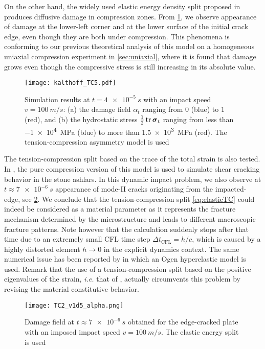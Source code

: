 On the other hand, the widely used elastic energy density split proposed in \cite{MieheHofackerWelschinger:2010} produces diffusive damage in compression zones. From \cref{fig:v1d5_miehe}, we observe appearance of damage at the lower-left corner and at the lower surface of the initial crack edge, even though they are both under compression. This phenomena is conforming to our previous theoretical analysis of this model on a homogeneous uniaxial compression experiment in \cref{sec:uniaxial}, where it is found that damage grows even though the compressive stress is still increasing in its absolute value.
\begin{figure}[htbp]
\centering
\texttt{[image: kalthoff\_TC5.pdf]}
\caption{Simulation results at $t=\SI{4e-5}{s}$ with an impact speed $v=\SI{100}{m/s}$: (a) the damage field $\alpha_t$ ranging from 0 (blue) to 1 (red), and (b) the hydrostatic stress $\frac{1}{2}\tr\sig_t$ ranging from less than \SI{-1e4}{MPa} (blue) to more than \SI{1.5e3}{MPa} (red). The tension-compression asymmetry model \cite{MieheHofackerWelschinger:2010} is used} \label{fig:v1d5_miehe}
\end{figure}

The tension-compression split based on the trace of the total strain \cite{AmorMarigoMaurini:2009} is also tested. In \cite{LancioniRoyer-Carfagni:2009}, the pure compression version of this model is used to simulate shear cracking behavior in the stone ashlars. In this dynamic impact problem, we also observe at $t\approx\SI{7e-6}{s}$ appearance of mode-\RN{2} cracks originating from the impacted-edge, see \cref{fig:TC2}. We conclude that the tension-compression split \eqref{eq:elasticTC} could indeed be considered as a material parameter as it represents the fracture mechanism determined by the microstructure and leads to different macroscopic fracture patterns. Note however that the calculation suddenly stops after that time due to an extremely small CFL time step $\Delta t_\mathrm{CFL}=h/c$, which is caused by a highly distorted element $h\to 0$ in the explicit dynamics context. The same numerical issue has been reported by \cite{PieroLancioniMarch:2007} in which an Ogen hyperelastic model is used. Remark that the use of a tension-compression split based on the positive eigenvalues of the strain, \emph{i.e.} that of \cite{MieheHofackerWelschinger:2010,FreddiRoyer-Carfagni:2010}, actually circumvents this problem by revising the material constitutive behavior.
\begin{figure}[htbp]
\centering
\texttt{[image: TC2\_v1d5\_alpha.png]}
\caption{Damage field at $t\approx\SI{7e-6}{s}$ obtained for the edge-cracked plate with an imposed impact speed $v=\SI{100}{m/s}$. The elastic energy split \cite{AmorMarigoMaurini:2009} is used} \label{fig:TC2}
\end{figure}

